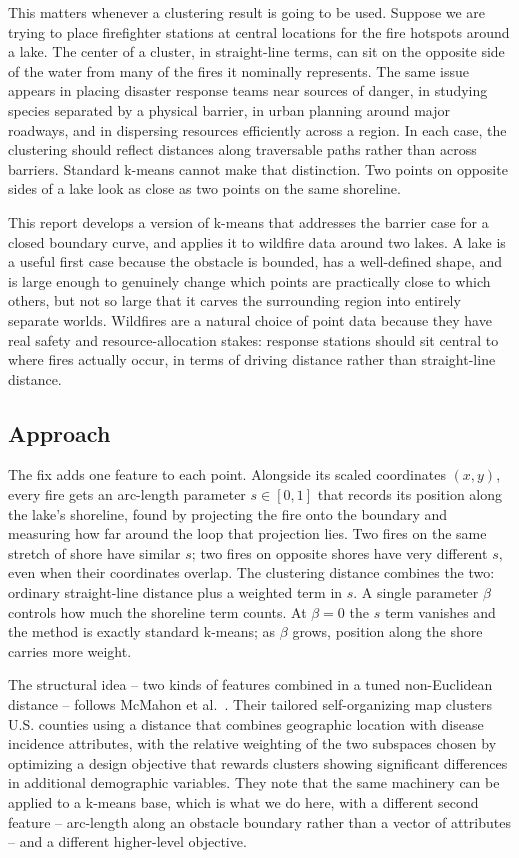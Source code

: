 \documentclass[11pt]{article}
\begin{document}
This matters whenever a clustering result is going to be used. Suppose we are trying to place firefighter stations at central locations for the fire hotspots around a lake. The center of a cluster, in straight-line terms, can sit on the opposite side of the water from many of the fires it nominally represents. The same issue appears in placing disaster response teams near sources of danger, in studying species separated by a physical barrier, in urban planning around major roadways, and in dispersing resources efficiently across a region. In each case, the clustering should reflect distances along traversable paths rather than across barriers. Standard k-means cannot make that distinction. Two points on opposite sides of a lake look as close as two points on the same shoreline.
 
This report develops a version of k-means that addresses the barrier case for a closed boundary curve, and applies it to wildfire data around two lakes. A lake is a useful first case because the obstacle is bounded, has a well-defined shape, and is large enough to genuinely change which points are practically close to which others, but not so large that it carves the surrounding region into entirely separate worlds. Wildfires are a natural choice of point data because they have real safety and resource-allocation stakes: response stations should sit central to where fires actually occur, in terms of driving distance rather than straight-line distance.
 
\subsection{Approach}
 
The fix adds one feature to each point. Alongside its scaled coordinates $(x, y)$, every fire gets an arc-length parameter $s \in [0, 1]$ that records its position along the lake's shoreline, found by projecting the fire onto the boundary and measuring how far around the loop that projection lies. Two fires on the same stretch of shore have similar $s$; two fires on opposite shores have very different $s$, even when their coordinates overlap. The clustering distance combines the two: ordinary straight-line distance plus a weighted term in $s$. A single parameter $\beta$ controls how much the shoreline term counts. At $\beta = 0$ the $s$ term vanishes and the method is exactly standard k-means; as $\beta$ grows, position along the shore carries more weight.

The structural idea -- two kinds of features combined in a tuned non-Euclidean distance -- follows McMahon et al.~\cite{mcmahon2022}. Their tailored self-organizing map clusters U.S. counties using a distance that combines geographic location with disease incidence attributes, with the relative weighting of the two subspaces chosen by optimizing a design objective that rewards clusters showing significant differences in additional demographic variables. They note that the same machinery can be applied to a k-means base, which is what we do here, with a different second feature -- arc-length along an obstacle boundary rather than a vector of attributes -- and a different higher-level objective.
 
\end{document}
